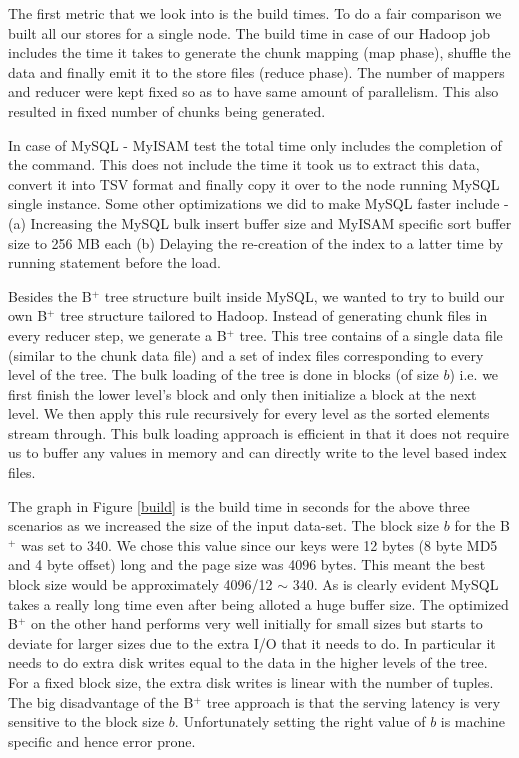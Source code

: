 The first metric that we look into is the build times. To do a fair comparison we built all our stores for a single node. The build time in case of our Hadoop job includes the time it takes to generate the chunk mapping (map phase), shuffle the data and finally emit it to the store files (reduce phase). The number of mappers and reducer were kept fixed so as to have same amount of parallelism. This also resulted in fixed number of chunks being generated.

In case of MySQL - MyISAM test the total time only includes the completion of the  command. This does not include the time it took us to extract this data, convert it into TSV format and finally copy it over to the node running MySQL single instance. Some other optimizations we did to make MySQL faster include - (a) Increasing the MySQL bulk insert buffer size and MyISAM specific sort buffer size to 256 MB each (b) Delaying the re-creation of the index to a latter time by running  statement before the load. 

Besides the B$^{+}$ tree structure built inside MySQL, we wanted to try to build our own B$^{+}$ tree structure tailored to Hadoop. Instead of generating chunk files in every reducer step, we generate a B$^{+}$ tree. This tree contains of a single data file (similar to the chunk data file) and a set of index files corresponding to every level of the tree. The bulk loading of the tree is done in blocks (of size $b$) i.e. we first finish the lower level's block and only then initialize a block at the next level. We then apply this rule recursively for every level as the sorted elements stream through. This bulk loading approach is efficient in that it does not require us to buffer any values in memory and can directly write to the level based index files. 

The graph in Figure \ref{build} is the build time in seconds for the above three scenarios as we increased the size of the input data-set. The block size $b$ for the B$^{+}$ was set to 340. We chose this value since our keys were 12 bytes (8 byte MD5 and 4 byte offset) long and the page size was 4096 bytes. This meant the best block size would be approximately 4096/12 $\sim$ 340. As is clearly evident MySQL takes a really long time even after being alloted a huge buffer size. The optimized B$^{+}$ on the other hand performs very well initially for small sizes but starts to deviate for larger sizes due to the extra I/O that it needs to do. In particular it needs to do extra disk writes equal to the data in the higher levels of the tree. For a fixed block size, the extra disk writes is linear with the number of tuples. The big disadvantage of the B$^{+}$ tree approach is that the serving latency is very sensitive to the block size $b$. Unfortunately setting the right value of $b$ is machine specific and hence error prone. 

